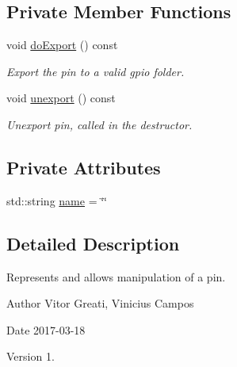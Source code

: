\subsection*{Private Member Functions}
\begin{DoxyCompactItemize}
\item 
void \hyperlink{classPin_ac49d24a8fac749976505da22d2a96138}{do\-Export} () const 
\begin{DoxyCompactList}\small\item\em Export the pin to a valid gpio folder. \end{DoxyCompactList}\item 
\hypertarget{classPin_aba1b46166fe84fbcb5c72a4efbb1e078}{void \hyperlink{classPin_aba1b46166fe84fbcb5c72a4efbb1e078}{unexport} () const }\label{classPin_aba1b46166fe84fbcb5c72a4efbb1e078}

\begin{DoxyCompactList}\small\item\em Unexport pin, called in the destructor. \end{DoxyCompactList}\end{DoxyCompactItemize}
\subsection*{Private Attributes}
\begin{DoxyCompactItemize}
\item 
std\-::string \hyperlink{classPin_ad940005d3eda19065f03f1deb6b469d1}{name} = \char`\"{}\char`\"{}
\end{DoxyCompactItemize}


\subsection{Detailed Description}
Represents and allows manipulation of a pin. 

\begin{DoxyAuthor}{Author}
Vitor Greati, Vinicius Campos 
\end{DoxyAuthor}
\begin{DoxyDate}{Date}
2017-\/03-\/18 
\end{DoxyDate}
\begin{DoxyVersion}{Version}
1. 
\end{DoxyVersion}


